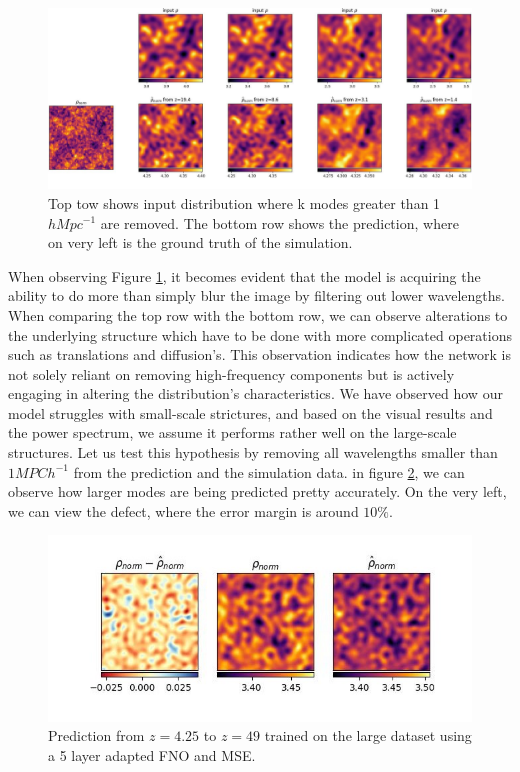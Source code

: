 \documentclass{article}
\begin{document}
\begin{figure}[h]
    \centering
    \includegraphics[width=0.9\linewidth]{img/compare_filtered.jpg}
    \caption{Top tow shows input distribution where k modes greater than 1 $h Mpc^{-1}$ are removed. The bottom row shows the prediction, where on very left is the ground truth of the simulation.}
    \label{fig:filter}
\end{figure}

When observing Figure \ref{fig:filter}, it becomes evident that the model is acquiring the ability to do more than simply blur the image by filtering out lower wavelengths. When comparing the top row with the bottom row, we can observe alterations to the underlying structure which have to be done with more complicated operations such as translations and diffusion's. This observation indicates how the network is not solely reliant on removing high-frequency components but is actively engaging in altering the distribution's characteristics. We have observed how our model struggles with small-scale strictures, and based on the visual results and the power spectrum, we assume it performs rather well on the large-scale structures. Let us test this hypothesis by removing all wavelengths smaller than $1MPC h^{-1}$ from the prediction and the simulation data. in figure \ref{fig:low-modes}, we can observe how larger modes are being predicted pretty accurately. On the very left, we can view the defect, where the error margin is around $10\%$.

\begin{figure}[h]
    \centering
    \includegraphics[width=0.5\linewidth]{img/distr_cmp.jpg}
    \caption{Prediction from $z=4.25$ to $z=49$ trained on the large dataset using a 5 layer adapted FNO and MSE.}
    \label{fig:low-modes}
\end{figure}
\end{document}
